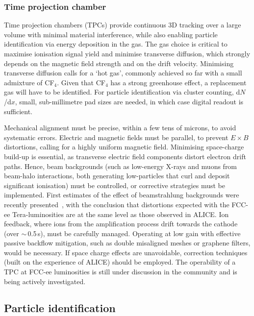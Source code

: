 \subsubsection{Time projection chamber}

Time projection chambers (TPCs) provide continuous 3D tracking over a large volume with minimal material interference, 
while also enabling particle identification via energy deposition in the gas. 
The gas choice is critical to maximise ionisation signal yield and minimise transverse diffusion, 
which strongly depends on the magnetic field strength and on the drift velocity. 
Minimising transverse diffusion calls for a `hot gas', commonly achieved so far with a small admixture of CF$_4$. 
Given that CF$_4$ has a strong greenhouse effect, a replacement gas will have to be identified. 
For particle identification via cluster counting, d$N$/d$x$, small, sub-millimetre pad sizes are needed, in which case digital readout is sufficient.

Mechanical alignment must be precise, within a few tens of microns, to avoid systematic errors. 
Electric and magnetic fields must be parallel, to prevent $E \times B$ distortions, calling for a highly uniform magnetic field. 
Minimising space-charge build-up is essential, as transverse electric field components distort electron drift paths. 
Hence, beam backgrounds 
(such as low-energy X-rays and muons from beam-halo interactions, both generating low-\pt particles that curl and deposit significant ionisation) 
must be controlled, or corrective strategies must be implemented. 
First estimates of the effect of beamstrahlung backgrounds were recently presented~\cite{DJeansECFA-Paris}, 
with the conclusion that distortions expected with the FCC-ee Tera-\PZ luminosities are at the same level as those observed in ALICE.
%
Ion feedback, where ions from the amplification process drift towards the cathode (over $\sim$\,0.5\,s), must be carefully managed. 
Operating at low gain with effective passive backflow mitigation, 
such as double misaligned meshes or graphene filters, would be necessary. 
If space charge effects are unavoidable, correction techniques (built on the experience of ALICE) should be employed.
%
The operability of a TPC at FCC-ee luminosities is still under discussion in the community and is being actively investigated. 

\subsection{Particle identification}

